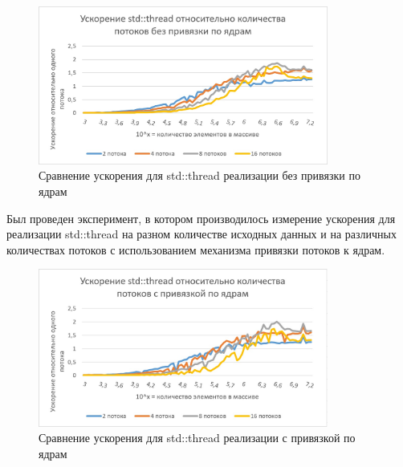 \documentclass{report}
\begin{document}
\begin{figure}[H]
    \centering
    \includegraphics[width=0.85\textwidth]{../../modules/task_1/ivanov_arkady_rbms/images/boost_std_without_affinity.jpg}
    \caption{Сравнение ускорения для std::thread реализации без привязки по ядрам}
    \label{fig:my_label_5}
\end{figure}
\par Был проведен эксперимент, в котором производилось измерение ускорения для реализации std::thread на разном количестве исходных данных и на различных количествах потоков с использованием механизма привязки потоков к ядрам.
\begin{figure}[H]
    \centering
    \includegraphics[width=0.85\textwidth]{../../modules/task_1/ivanov_arkady_rbms/images/boost_std_with_affinity.jpg}
    \caption{Сравнение ускорения для std::thread реализации с привязкой по ядрам}
    \label{fig:my_label_6}
\end{figure}

\newpage

\end{document}
